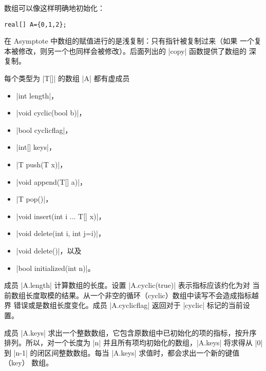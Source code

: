\documentclass[nofonts,CJKnormalspaces]{ctexbook}[2009/05/20]
\newcommand*\prgname[1]{\textsf{#1}}
\begin{document}
{{{数组可以像这样明确地初始化：
\begin{lstlisting}
real[] A={0,1,2};
\end{lstlisting}

在 \prgname{Asymptote} 中数组的赋值进行的是浅复制：只有指针被复制过来（如果
一个复本被修改，则另一个也同样会被修改）。后面列出的 |copy| 函数提供了数组的
深复制。

每个类型为 |T[]| 的数组 |A| 都有虚成员
\begin{itemize}
  \item |int length|，
  \item |void cyclic(bool b)|，
  \item |bool cyclicflag|，
  \item |int[] keys|，
  \item |T push(T x)|，
  \item |void append(T[] a)|，
  \item |T pop()|，
  \item |void insert(int i ... T[] x)|，
  \item |void delete(int i, int j=i)|，
  \item |void delete()|，以及
  \item |bool initialized(int n)|。
\end{itemize}

成员 |A.length| 计算数组的长度。设置 |A.cyclic(true)| 表示指标应该约化为对
当前数组长度取模的结果。从一个非空的循环（cyclic）数组中读写不会造成指标越界
错误或是数组长度变化。成员 |A.cyclicflag| 返回对于 |cyclic| 标记的当前设置。

成员 |A.keys| 求出一个整数数组，它包含原数组中已初始化的项的指标，按升序
排列。所以，对一个长度为 |n| 并且所有项均初始化的数组，|A.keys| 将求得从 |0|
到 |n-1| 的闭区间整数数组。每当 |A.keys| 求值时，都会求出一个新的键值（key）
数组。

}}}
\end{document}
